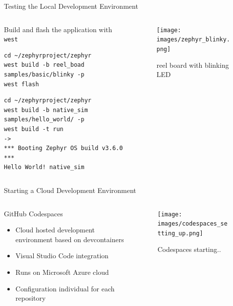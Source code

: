 \documentclass[10pt, aspectratio=169]{beamer}
\begin{document}
\begin{frame}[fragile]{Testing the Local Development Environment}
  \begin{columns}
    \begin{column}{0.6\textwidth}
    Build and flash the application with \texttt{west}
    \begin{verbatim}
cd ~/zephyrproject/zephyr
west build -b reel_boad samples/basic/blinky -p
west flash
    \end{verbatim}
    \begin{verbatim}
cd ~/zephyrproject/zephyr
west build -b native_sim samples/hello_world/ -p
west build -t run
->
*** Booting Zephyr OS build v3.6.0 ***
Hello World! native_sim
    \end{verbatim}
    \end{column}
    \begin{column}{0.4\textwidth}
      \begin{figure}
        \texttt{[image: images/zephyr\_blinky.png]}
        \caption*{reel board with blinking LED}
      \end{figure}
    \end{column}
  \end{columns}
\end{frame}
\begin{frame}[fragile]{Starting a Cloud Development Environment}
  \begin{columns}
    \begin{column}{0.6\textwidth}
    GitHub Codespaces \footnotemark
    \begin{itemize}
      \item Cloud hosted development environment based on devcontainers
      \item Visual Studio Code integration
      \item Runs on Microsoft Azure cloud
      \item Configuration individual for each repository
    \end{itemize}
    \end{column}
    \begin{column}{0.4\textwidth}
      \begin{figure}
        \texttt{[image: images/codespaces\_setting\_up.png]}
        \caption*{Codespaces starting..}
      \end{figure}
    \end{column}
  \end{columns}
\end{frame}
\end{document}
